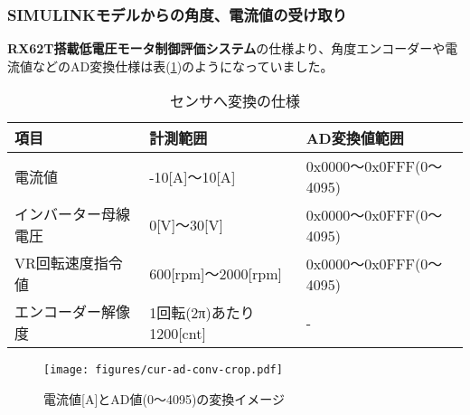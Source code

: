 \documentclass[uplatex,a4paper,twoside,10pt]{jsarticle}
\begin{document}
\subsubsection{SIMULINKモデルからの角度、電流値の受け取り}
{\bf RX62T搭載低電圧モータ制御評価システム}の仕様より、角度エンコーダーや電流値などのAD変換仕様は表(\ref{DLL-AD})のようになっていました。
{\small
\begin{table}[htbp!]
\centering
\caption{センサへ変換の仕様}
\label{DLL-AD}
\begin{tabular}{|l|l|l|}
\hline
項目         & 計測範囲                       & AD変換値範囲               \\ \hline
電流値        & -10{[}A{]}～10{[}A{]}       & 0x0000～0x0FFF(0～4095) \\ \hline
インバーター母線電圧 & 0{[}V{]}～30{[}V{]}         & 0x0000～0x0FFF(0～4095) \\ \hline
VR回転速度指令値  & 600{[}rpm{]}～2000{[}rpm{]} & 0x0000～0x0FFF(0～4095) \\ \hline
エンコーダー解像度  & 1回転(2π)あたり1200{[}cnt{]}    & -                     \\ \hline
\end{tabular}
\end{table}}

\begin{figure}[htbp!]
\begin{center}
    \texttt{[image: figures/cur-ad-conv-crop.pdf]}
\end{center}
\caption{電流値[A]とAD値(0～4095)の変換イメージ}
\label{setbldcdata}
\end{figure}
\end{document}
